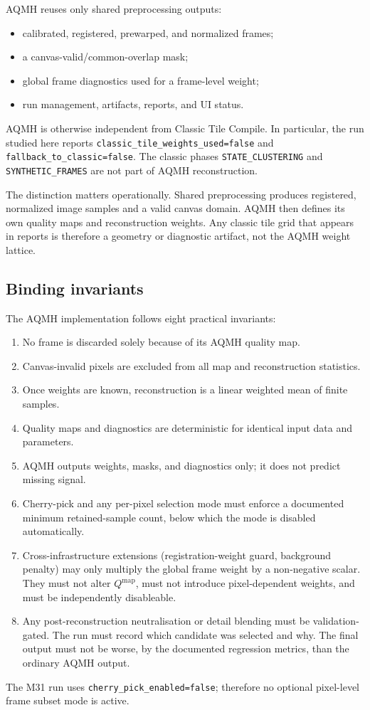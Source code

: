 \documentclass[10pt,twocolumn]{article}
\begin{document}
AQMH reuses only shared preprocessing outputs:
\begin{itemize}
  \item calibrated, registered, prewarped, and normalized frames;
  \item a canvas-valid/common-overlap mask;
  \item global frame diagnostics used for a frame-level weight;
  \item run management, artifacts, reports, and UI status.
\end{itemize}
AQMH is otherwise independent from Classic Tile Compile. In particular, the run studied here
reports \texttt{classic\_tile\_weights\_used=false} and
\texttt{fallback\_to\_classic=false}. The classic phases \texttt{STATE\_CLUSTERING} and
\texttt{SYNTHETIC\_FRAMES} are not part of AQMH reconstruction.

The distinction matters operationally. Shared preprocessing produces registered, normalized image
samples and a valid canvas domain. AQMH then defines its own quality maps and reconstruction
weights. Any classic tile grid that appears in reports is therefore a geometry or diagnostic
artifact, not the AQMH weight lattice.

\subsection{Binding invariants}

The AQMH implementation follows eight practical invariants:
\begin{enumerate}
  \item No frame is discarded solely because of its AQMH quality map.
  \item Canvas-invalid pixels are excluded from all map and reconstruction statistics.
  \item Once weights are known, reconstruction is a linear weighted mean of finite samples.
  \item Quality maps and diagnostics are deterministic for identical input data and parameters.
  \item AQMH outputs weights, masks, and diagnostics only; it does not predict missing signal.
  \item Cherry-pick and any per-pixel selection mode must enforce a documented minimum
        retained-sample count, below which the mode is disabled automatically.
  \item Cross-infrastructure extensions (registration-weight guard, background penalty) may only
        multiply the global frame weight by a non-negative scalar. They must not alter
        $Q^{\mathrm{map}}$, must not introduce pixel-dependent weights, and must be independently
        disableable.
  \item Any post-reconstruction neutralisation or detail blending must be validation-gated. The
        run must record which candidate was selected and why. The final output must not be worse,
        by the documented regression metrics, than the ordinary AQMH output.
\end{enumerate}
The M31 run uses \texttt{cherry\_pick\_enabled=false}; therefore no optional pixel-level
frame subset mode is active.
\end{document}
